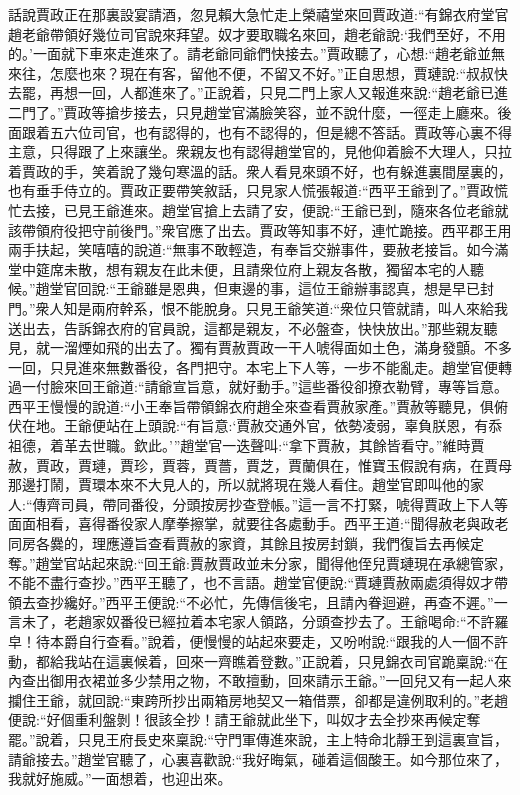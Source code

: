 


\begin{parag}
    話說賈政正在那裏設宴請酒，忽見賴大急忙走上榮禧堂來回賈政道:“有錦衣府堂官趙老爺帶領好幾位司官說來拜望。奴才要取職名來回，趙老爺說:‘我們至好，不用的。’一面就下車來走進來了。請老爺同爺們快接去。”賈政聽了，心想:“趙老爺並無來往，怎麼也來？現在有客，留他不便，不留又不好。”正自思想，賈璉說:“叔叔快去罷，再想一回，人都進來了。”正說着，只見二門上家人又報進來說:“趙老爺已進二門了。”賈政等搶步接去，只見趙堂官滿臉笑容，並不說什麼，一徑走上廳來。後面跟着五六位司官，也有認得的，也有不認得的，但是總不答話。賈政等心裏不得主意，只得跟了上來讓坐。衆親友也有認得趙堂官的，見他仰着臉不大理人，只拉着賈政的手，笑着說了幾句寒溫的話。衆人看見來頭不好，也有躲進裏間屋裏的，也有垂手侍立的。賈政正要帶笑敘話，只見家人慌張報道:“西平王爺到了。”賈政慌忙去接，已見王爺進來。趙堂官搶上去請了安，便說:“王爺已到，隨來各位老爺就該帶領府役把守前後門。”衆官應了出去。賈政等知事不好，連忙跪接。西平郡王用兩手扶起，笑嘻嘻的說道:“無事不敢輕造，有奉旨交辦事件，要赦老接旨。如今滿堂中筵席未散，想有親友在此未便，且請衆位府上親友各散，獨留本宅的人聽候。”趙堂官回說:“王爺雖是恩典，但東邊的事，這位王爺辦事認真，想是早已封門。”衆人知是兩府幹系，恨不能脫身。只見王爺笑道:“衆位只管就請，叫人來給我送出去，告訴錦衣府的官員說，這都是親友，不必盤查，快快放出。”那些親友聽見，就一溜煙如飛的出去了。獨有賈赦賈政一干人唬得面如土色，滿身發顫。不多一回，只見進來無數番役，各門把守。本宅上下人等，一步不能亂走。趙堂官便轉過一付臉來回王爺道:“請爺宣旨意，就好動手。”這些番役卻撩衣勒臂，專等旨意。西平王慢慢的說道:“小王奉旨帶領錦衣府趙全來查看賈赦家產。”賈赦等聽見，俱俯伏在地。王爺便站在上頭說:“有旨意:‘賈赦交通外官，依勢凌弱，辜負朕恩，有忝祖德，着革去世職。欽此。’”趙堂官一迭聲叫:“拿下賈赦，其餘皆看守。”維時賈赦，賈政，賈璉，賈珍，賈蓉，賈薔，賈芝，賈蘭俱在，惟寶玉假說有病，在賈母那邊打鬧，賈環本來不大見人的，所以就將現在幾人看住。趙堂官即叫他的家人:“傳齊司員，帶同番役，分頭按房抄查登帳。”這一言不打緊，唬得賈政上下人等面面相看，喜得番役家人摩拳擦掌，就要往各處動手。西平王道:“聞得赦老與政老同房各爨的，理應遵旨查看賈赦的家資，其餘且按房封鎖，我們復旨去再候定奪。”趙堂官站起來說:“回王爺:賈赦賈政並未分家，聞得他侄兒賈璉現在承總管家，不能不盡行查抄。”西平王聽了，也不言語。趙堂官便說:“賈璉賈赦兩處須得奴才帶領去查抄纔好。”西平王便說:“不必忙，先傳信後宅，且請內眷迴避，再查不遲。”一言未了，老趙家奴番役已經拉着本宅家人領路，分頭查抄去了。王爺喝命:“不許羅皁！待本爵自行查看。”說着，便慢慢的站起來要走，又吩咐說:“跟我的人一個不許動，都給我站在這裏候着，回來一齊瞧着登數。”正說着，只見錦衣司官跪稟說:“在內查出御用衣裙並多少禁用之物，不敢擅動，回來請示王爺。”一回兒又有一起人來攔住王爺，就回說:“東跨所抄出兩箱房地契又一箱借票，卻都是違例取利的。”老趙便說:“好個重利盤剝！很該全抄！請王爺就此坐下，叫奴才去全抄來再候定奪罷。”說着，只見王府長史來稟說:“守門軍傳進來說，主上特命北靜王到這裏宣旨，請爺接去。”趙堂官聽了，心裏喜歡說:“我好晦氣，碰着這個酸王。如今那位來了，我就好施威。”一面想着，也迎出來。
\end{parag}


